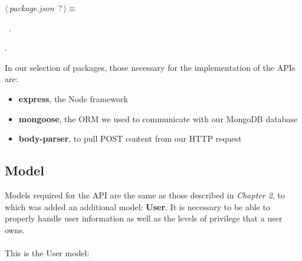 	\begin{flushleft} \small
\begin{minipage}{\linewidth}\label{scrap1}\raggedright\small
{} $\langle\,${\itshape {package.json}}\nobreak\ {\footnotesize {?}}$\,\rangle\equiv$
\vspace{-1ex}
\begin{list}{}{} \item

                
        {\NWsep}
\end{list}
\vspace{-1.5ex}
\footnotesize
\begin{list}{}{\setlength{\itemsep}{-\parsep}\setlength{\itemindent}{-\leftmargin}}
\item \NWtxtMacroDefBy\ .
\item {\NWtxtMacroNoRef}.

\item{}
\end{list}
\end{minipage}\vspace{4ex}
\end{flushleft}
In our selection of packages, those necessary for the implementation of the APIs are:

\begin{itemize}
	\item \textbf{express}, the Node framework
	\item \textbf{mongoose}, the ORM we used to communicate with our MongoDB database
	\item \textbf{body-parser}, to pull POST content from our HTTP request
\end{itemize}

\subsection{Model}

Models required for the API are the same as those described in \emph{Chapter 2}, to which was added an additional model: \textbf{User}. It is necessary to be able to properly handle user information as well as the levels of privilege that a user owns. 
\\
\\This is the User model:

